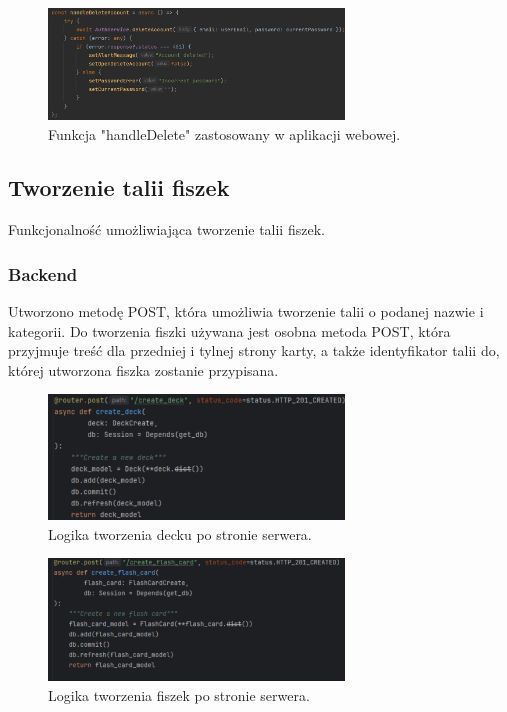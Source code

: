 \begin{figure}[H]
    \centering
    \includegraphics[width=0.7\textwidth]{chapters/chapter_8/screens/delete_user_web}
    \caption{Funkcja "handleDelete" zastosowany w aplikacji webowej.}
    \label{img:delete_user_web}
\end{figure}

\subsection{Tworzenie talii fiszek}

Funkcjonalność umożliwiająca tworzenie talii fiszek.

\subsubsection{Backend}

Utworzono metodę POST, która umożliwia tworzenie talii o podanej nazwie i kategorii. Do tworzenia fiszki używana jest osobna metoda POST, która przyjmuje treść dla przedniej i tylnej strony karty, a także identyfikator talii do, której utworzona fiszka zostanie przypisana.

\begin{figure}[H]
    \centering
    \includegraphics[width=0.7\textwidth]{chapters/chapter_8/screens/create_deck_backend}
    \caption{Logika tworzenia decku po stronie serwera.}
    \label{img:create_deck_backend}
\end{figure}

\begin{figure}[H]
    \centering
    \includegraphics[width=0.7\textwidth]{chapters/chapter_8/screens/create_flash_card_backend}
    \caption{Logika tworzenia fiszek po stronie serwera.}
    \label{img:create_flash_card_backend}
\end{figure}

